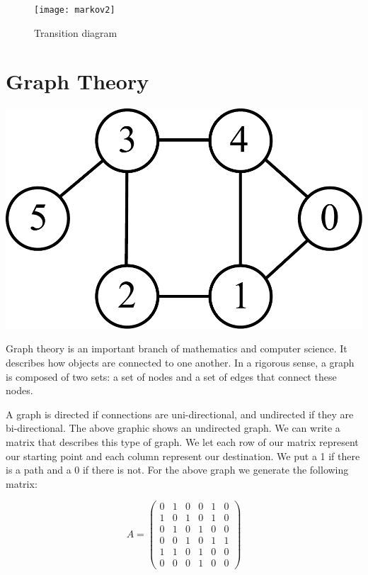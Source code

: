 \begin{figure}[h!]
\begin{center}
\texttt{[image: markov2]}
\end{center}
\caption{Transition diagram}
\end{figure}

\newpage

\section*{Graph Theory}
\begin{center}
\includegraphics[scale = .8]{graphExample}
\end{center}

Graph theory is an important branch of mathematics and computer science. It describes how objects are connected to one another. In a rigorous sense, a graph is composed of two sets: a set of nodes and a set of edges that connect these nodes. 

A graph is directed if connections are uni-directional, and undirected if they are bi-directional. The above graphic shows an undirected graph. We can write a matrix that describes this type of graph. We let each row of our matrix represent our starting point and each column represent our destination. We put a 1 if there is a path and a 0 if there is not. For the above graph we generate the following matrix:

\[
A = \begin{pmatrix}
0 & 1 & 0 & 0 & 1 & 0\\
1 & 0 & 1 & 0 & 1 & 0\\
0 & 1 & 0 & 1 & 0 & 0\\
0 & 0 & 1 & 0 & 1 & 1\\
1 & 1 & 0 & 1 & 0 & 0\\
0 & 0 & 0 & 1 & 0 & 0
\end{pmatrix}
\]

